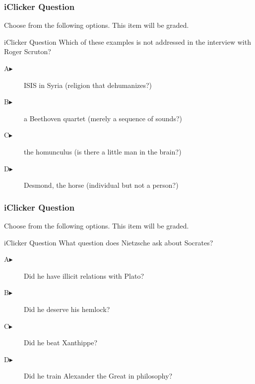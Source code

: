 \documentclass[xcolor=dvipsnames]{beamer}
\begin{document}
\begin{frame}
  \frametitle{iClicker Question}
Choose from the following options. This item will be graded.
\begin{block}{iClicker Question}
Which of these examples is not addressed in the interview with Roger Scruton?
\end{block}
\begin{description}
\item[A\hspace{.2in}$\blacktriangleright$] ISIS in Syria (religion that dehumanizes?)
\item[B\hspace{.2in}$\blacktriangleright$] a Beethoven quartet (merely a sequence of sounds?)
\item[C\hspace{.2in}$\blacktriangleright$] the homunculus (is there a little man in the brain?)
\item[D\hspace{.2in}$\blacktriangleright$] Desmond, the horse (individual but not a person?)
\end{description}
\end{frame}

\begin{frame}
  \frametitle{iClicker Question}
Choose from the following options. This item will be graded.
\begin{block}{iClicker Question}
What question does Nietzsche ask about Socrates?
\end{block}
\begin{description}
\item[A\hspace{.2in}$\blacktriangleright$] Did he have illicit relations with Plato?
\item[B\hspace{.2in}$\blacktriangleright$] Did he deserve his hemlock?
\item[C\hspace{.2in}$\blacktriangleright$] Did he beat Xanthippe?
\item[D\hspace{.2in}$\blacktriangleright$] Did he train Alexander the Great in philosophy?
\end{description}
\end{frame}
\end{document}

